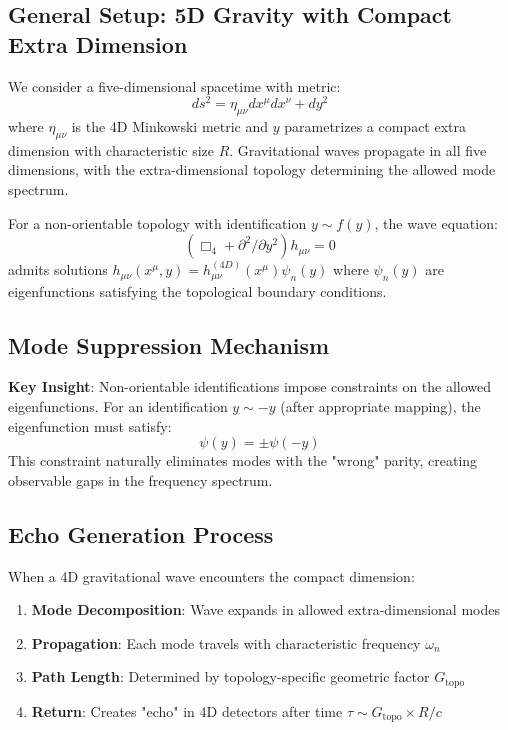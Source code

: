 \documentclass[11pt,a4paper]{article}
\begin{document}
\subsection{General Setup: 5D Gravity with Compact Extra Dimension}

We consider a five-dimensional spacetime with metric:
\begin{equation}
ds^2 = \eta_{\mu\nu} dx^\mu dx^\nu + dy^2
\end{equation}
where $\eta_{\mu\nu}$ is the 4D Minkowski metric and $y$ parametrizes a compact extra dimension with characteristic size $R$. Gravitational waves propagate in all five dimensions, with the extra-dimensional topology determining the allowed mode spectrum.

For a non-orientable topology with identification $y \sim f(y)$, the wave equation:
\begin{equation}
(\Box_4 + \partial^2/\partial y^2)h_{\mu\nu} = 0
\end{equation}
admits solutions $h_{\mu\nu}(x^\mu, y) = h_{\mu\nu}^{(4D)}(x^\mu) \psi_n(y)$ where $\psi_n(y)$ are eigenfunctions satisfying the topological boundary conditions.

\subsection{Mode Suppression Mechanism}

\textbf{Key Insight}: Non-orientable identifications impose constraints on the allowed eigenfunctions. For an identification $y \sim -y$ (after appropriate mapping), the eigenfunction must satisfy:
\begin{equation}
\psi(y) = \pm\psi(-y)
\end{equation}
This constraint naturally eliminates modes with the "wrong" parity, creating observable gaps in the frequency spectrum.

\subsection{Echo Generation Process}

When a 4D gravitational wave encounters the compact dimension:
\begin{enumerate}
    \item \textbf{Mode Decomposition}: Wave expands in allowed extra-dimensional modes
    \item \textbf{Propagation}: Each mode travels with characteristic frequency $\omega_n$
    \item \textbf{Path Length}: Determined by topology-specific geometric factor $G_{\text{topo}}$
    \item \textbf{Return}: Creates "echo" in 4D detectors after time $\tau \sim G_{\text{topo}} \times R/c$
\end{enumerate}
\end{document}
